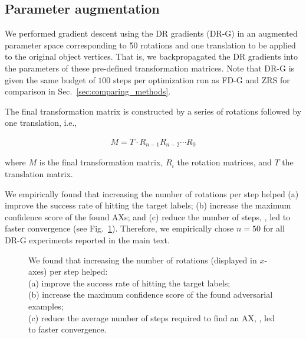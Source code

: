 \documentclass[10pt,twocolumn,letterpaper]{article}
\begin{document}
\subsection{Parameter augmentation}%
\label{sec:param-augm}

We performed gradient descent using the DR gradients (DR-G) in an augmented parameter space corresponding to 50 rotations and one translation to be applied to the original object vertices.
That is, we backpropagated the DR gradients into the parameters of these pre-defined transformation matrices.
Note that DR-G is given the same budget of $100$ steps per optimization run as FD-G and ZRS for comparison in Sec.~\ref{sec:comparing_methods}.

The final transformation matrix is constructed by a series of rotations followed
by one translation, i.e., 

\begin{align*}
M = T\cdot R_{n-1}R_{n-2}\cdots R_0
\end{align*}

\noindent where \(M\) is the final transformation matrix, \(R_i\) the rotation matrices, and \(T\) the translation matrix.  

We empirically found that increasing the number of rotations per step helped (a) improve the success rate of hitting the target labels; (b) increase the maximum confidence score of the found AXs; and (c) reduce the number of steps, \ie, led to faster convergence (see Fig.~\ref{fig:param-augm}).
Therefore, we empirically chose $n=50$ for all DR-G experiments reported in the main text.


\begin{figure}[h]
  \centering
	\caption{
  	We found that increasing the number of rotations (displayed in $x$-axes) per step helped:\\
  	(a) improve the success rate of hitting the target labels;\\
  	(b) increase the maximum confidence score of the found adversarial examples;\\
  	(c) reduce the average number of steps required to find an AX, \ie, led to faster convergence.\\
}
\label{fig:param-augm}
\end{figure}
\end{document}
